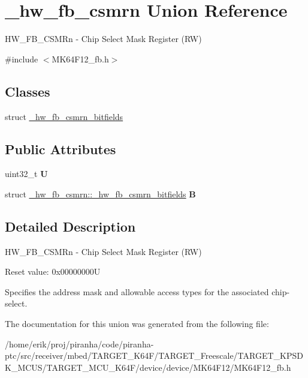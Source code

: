 \hypertarget{union__hw__fb__csmrn}{}\section{\+\_\+hw\+\_\+fb\+\_\+csmrn Union Reference}
\label{union__hw__fb__csmrn}


H\+W\+\_\+\+F\+B\+\_\+\+C\+S\+M\+Rn -\/ Chip Select Mask Register (RW)  




{\ttfamily \#include $<$M\+K64\+F12\+\_\+fb.\+h$>$}

\subsection*{Classes}
\begin{DoxyCompactItemize}
\item 
struct \hyperlink{struct__hw__fb__csmrn_1_1__hw__fb__csmrn__bitfields}{\+\_\+hw\+\_\+fb\+\_\+csmrn\+\_\+bitfields}
\end{DoxyCompactItemize}
\subsection*{Public Attributes}
\begin{DoxyCompactItemize}
\item 
uint32\+\_\+t {\bfseries U}\hypertarget{union__hw__fb__csmrn_a30f518ea11437795b07d837293e61448}{}\label{union__hw__fb__csmrn_a30f518ea11437795b07d837293e61448}

\item 
struct \hyperlink{struct__hw__fb__csmrn_1_1__hw__fb__csmrn__bitfields}{\+\_\+hw\+\_\+fb\+\_\+csmrn\+::\+\_\+hw\+\_\+fb\+\_\+csmrn\+\_\+bitfields} {\bfseries B}\hypertarget{union__hw__fb__csmrn_a3a2675880a1630da5d1ba72c2349d126}{}\label{union__hw__fb__csmrn_a3a2675880a1630da5d1ba72c2349d126}

\end{DoxyCompactItemize}


\subsection{Detailed Description}
H\+W\+\_\+\+F\+B\+\_\+\+C\+S\+M\+Rn -\/ Chip Select Mask Register (RW) 

Reset value\+: 0x00000000U

Specifies the address mask and allowable access types for the associated chip-\/select. 

The documentation for this union was generated from the following file\+:\begin{DoxyCompactItemize}
\item 
/home/erik/proj/piranha/code/piranha-\/ptc/src/receiver/mbed/\+T\+A\+R\+G\+E\+T\+\_\+\+K64\+F/\+T\+A\+R\+G\+E\+T\+\_\+\+Freescale/\+T\+A\+R\+G\+E\+T\+\_\+\+K\+P\+S\+D\+K\+\_\+\+M\+C\+U\+S/\+T\+A\+R\+G\+E\+T\+\_\+\+M\+C\+U\+\_\+\+K64\+F/device/device/\+M\+K64\+F12/M\+K64\+F12\+\_\+fb.\+h\end{DoxyCompactItemize}
